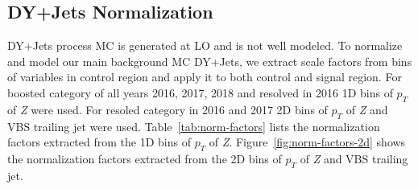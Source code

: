 \subsection{
  DY+Jets Normalization
}

DY+Jets process \gls{MC} is generated at \gls{LO} and is not well modeled.
To normalize and model our main background \gls{MC} DY+Jets,
we extract scale factors from bins of variables
in control region and apply it to both control and signal region.
For boosted category of all years 2016, 2017, 2018
and resolved in 2016 1D bins of \( p_T \) of \textit{Z} were used. For
resoled category in 2016 and 2017 2D bins of \( p_T \) of \textit{Z} and VBS trailing
jet were used. Table~\ref{tab:norm-factors} lists the normalization
factors extracted from the 1D bins of \( p_T \) of \textit{Z}.
Figure~\ref{fig:norm-factors-2d} shows the normalization factors extracted
from the 2D bins of \( p_T \) of \textit{Z} and VBS trailing jet.

